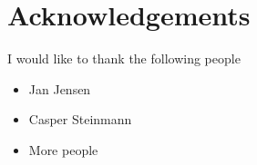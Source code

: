 \chapter*{Acknowledgements}
I would like to thank the following people

\begin{itemize}
\item Jan Jensen
\item Casper Steinmann
\item More people
\end{itemize}
